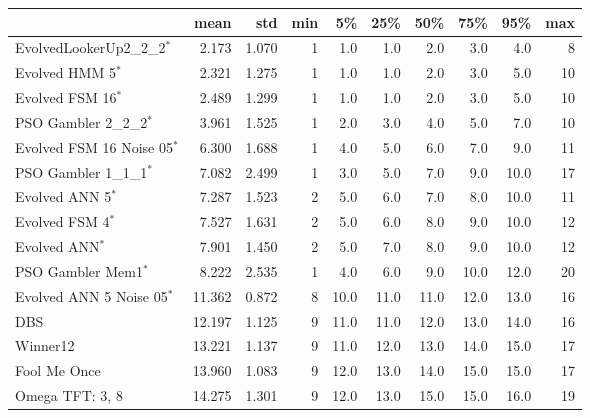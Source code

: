 \begin{tabular}{lrrrrrrrrr}
\toprule
{} &    mean &    std &  min &    5\% &   25\% &   50\% &   75\% &   95\% &  max \\
\midrule
EvolvedLookerUp2\_2\_2$^{*}$    &   2.173 &  1.070 &    1 &   1.0 &   1.0 &   2.0 &   3.0 &   4.0 &    8 \\
Evolved HMM 5$^{*}$           &   2.321 &  1.275 &    1 &   1.0 &   1.0 &   2.0 &   3.0 &   5.0 &   10 \\
Evolved FSM 16$^{*}$          &   2.489 &  1.299 &    1 &   1.0 &   1.0 &   2.0 &   3.0 &   5.0 &   10 \\
PSO Gambler 2\_2\_2$^{*}$       &   3.961 &  1.525 &    1 &   2.0 &   3.0 &   4.0 &   5.0 &   7.0 &   10 \\
Evolved FSM 16 Noise 05$^{*}$ &   6.300 &  1.688 &    1 &   4.0 &   5.0 &   6.0 &   7.0 &   9.0 &   11 \\
PSO Gambler 1\_1\_1$^{*}$       &   7.082 &  2.499 &    1 &   3.0 &   5.0 &   7.0 &   9.0 &  10.0 &   17 \\
Evolved ANN 5$^{*}$           &   7.287 &  1.523 &    2 &   5.0 &   6.0 &   7.0 &   8.0 &  10.0 &   11 \\
Evolved FSM 4$^{*}$           &   7.527 &  1.631 &    2 &   5.0 &   6.0 &   8.0 &   9.0 &  10.0 &   12 \\
Evolved ANN$^{*}$             &   7.901 &  1.450 &    2 &   5.0 &   7.0 &   8.0 &   9.0 &  10.0 &   12 \\
PSO Gambler Mem1$^{*}$        &   8.222 &  2.535 &    1 &   4.0 &   6.0 &   9.0 &  10.0 &  12.0 &   20 \\
Evolved ANN 5 Noise 05$^{*}$  &  11.362 &  0.872 &    8 &  10.0 &  11.0 &  11.0 &  12.0 &  13.0 &   16 \\
DBS                           &  12.197 &  1.125 &    9 &  11.0 &  11.0 &  12.0 &  13.0 &  14.0 &   16 \\
Winner12                      &  13.221 &  1.137 &    9 &  11.0 &  12.0 &  13.0 &  14.0 &  15.0 &   17 \\
Fool Me Once                  &  13.960 &  1.083 &    9 &  12.0 &  13.0 &  14.0 &  15.0 &  15.0 &   17 \\
Omega TFT: 3, 8               &  14.275 &  1.301 &    9 &  12.0 &  13.0 &  15.0 &  15.0 &  16.0 &   19 \\
\bottomrule
\end{tabular}
